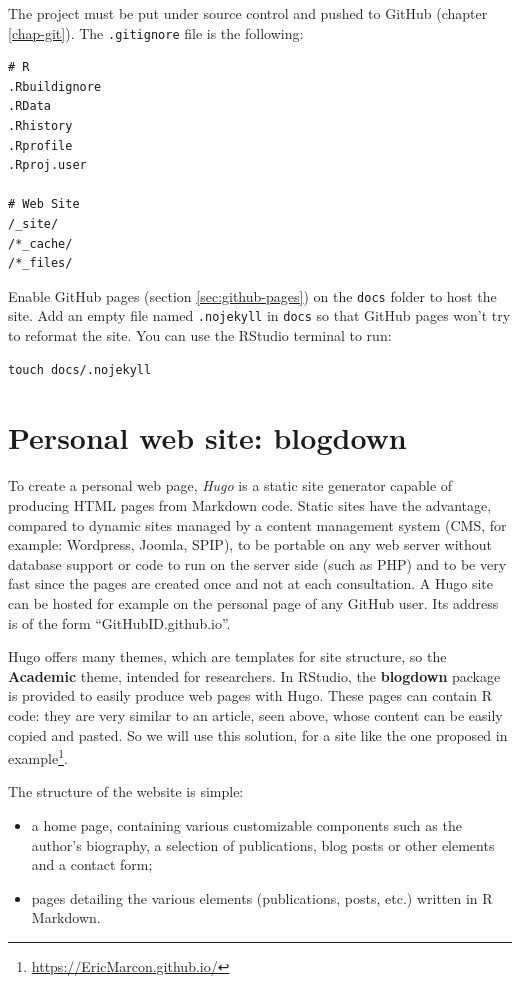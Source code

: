 \documentclass[
  12pt,
  american,
  a4paper,
  extrafontsizes,onecolumn,openright
  ]{memoir}
\providecommand{\tightlist}{%
  \setlength{\itemsep}{0pt}\setlength{\parskip}{0pt}}
\begin{document}
The project must be put under source control and pushed to GitHub (chapter \ref{chap-git}).
The \texttt{.gitignore} file is the following:

\begin{verbatim}
# R
.Rbuildignore
.RData
.Rhistory
.Rprofile
.Rproj.user

# Web Site
/_site/
/*_cache/
/*_files/
\end{verbatim}

Enable GitHub pages (section \ref{sec:github-pages}) on the \texttt{docs} folder to host the site.
Add an empty file named \texttt{.nojekyll} in \texttt{docs} so that GitHub pages won't try to reformat the site.
You can use the RStudio terminal to run:

\begin{verbatim}
touch docs/.nojekyll
\end{verbatim}

\hypertarget{sec:blogdown}{%
\section{Personal web site: blogdown}\label{sec:blogdown}}

To create a personal web page, \emph{Hugo} is a static site generator capable of producing HTML pages from Markdown code.
Static sites have the advantage, compared to dynamic sites managed by a content management system (CMS, for example: Wordpress, Joomla, SPIP), to be portable on any web server without database support or code to run on the server side (such as PHP) and to be very fast since the pages are created once and not at each consultation.
A Hugo site can be hosted for example on the personal page of any GitHub user.
Its address is of the form \enquote{GitHubID.github.io}.

Hugo offers many themes, which are templates for site structure, so the \textbf{Academic} theme, intended for researchers.
In RStudio, the \textbf{blogdown} package is provided to easily produce web pages with Hugo.
These pages can contain R code: they are very similar to an article, seen above, whose content can be easily copied and pasted.
So we will use this solution, for a site like the one proposed in example\footnote{\url{https://EricMarcon.github.io/}}.

The structure of the website is simple:

\begin{itemize}
\tightlist
\item
  a home page, containing various customizable components such as the author's biography, a selection of publications, blog posts or other elements and a contact form;
\item
  pages detailing the various elements (publications, posts, etc.) written in R Markdown.
\end{itemize}
\end{document}
